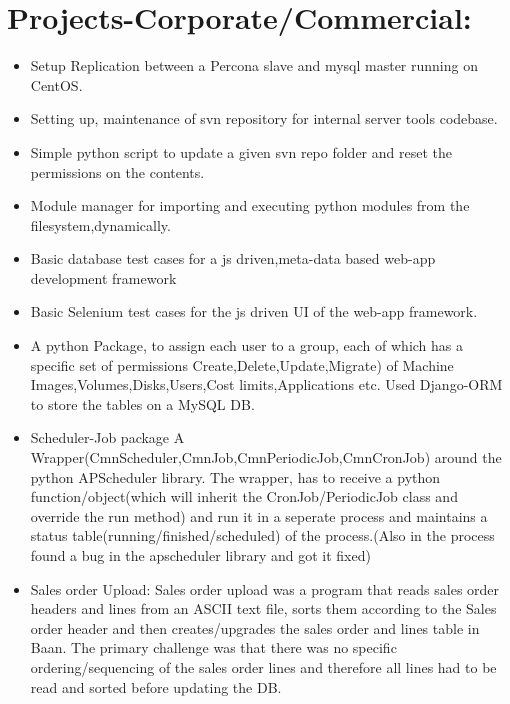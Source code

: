 \section{Projects-Corporate/Commercial:}
	\begin{itemize}
		\item Setup Replication between a Percona slave and mysql master running on CentOS.

	 	\item Setting up, maintenance of svn repository for internal server tools codebase.
	 	
		\item Simple python script to update a given svn repo folder and reset the permissions on the contents.

	 	\item Module manager for importing and executing python modules from the filesystem,dynamically.

	 	\item Basic database test cases for a js driven,meta-data based web-app development framework
		
		\item Basic Selenium test cases for the js driven UI of the web-app framework.

		\item A python Package, to assign each user to a group, each of which has a specific set of permissions Create,Delete,Update,Migrate) of Machine Images,Volumes,Disks,Users,Cost limits,Applications etc. Used Django-ORM to store the tables on a MySQL DB.

		\item Scheduler-Job package A Wrapper(CmnScheduler,CmnJob,CmnPeriodicJob,CmnCronJob) around the python APScheduler library. The wrapper, has to receive a python function/object(which will inherit the CronJob/PeriodicJob class and override the run method) and run it in a seperate process and maintains a status table(running/finished/scheduled) of the process.(Also in the process found a bug in the apscheduler library and got it fixed)

		\item Sales order Upload: Sales order upload was a program that reads sales order headers and lines from an ASCII text file, sorts them according to the Sales order header and then creates/upgrades the sales order and lines table in Baan. The primary challenge was that there was no specific ordering/sequencing of the sales order lines and therefore all lines had to be read and sorted before updating the DB.


\end{itemize}

